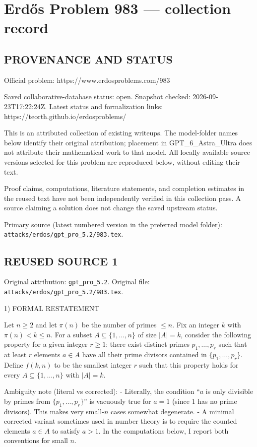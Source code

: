 \section*{Erd\H{o}s Problem 983 --- collection record}

\subsection*{PROVENANCE AND STATUS}
Official problem: https://www.erdosproblems.com/983

Saved collaborative-database status: open.
Snapshot checked: 2026-09-23T17:22:24Z.
Latest status and formalization links: https://teorth.github.io/erdosproblems/

This is an attributed collection of existing writeups. The model-folder names below identify their original attribution; placement in GPT\_6\_Astra\_Ultra does not attribute their mathematical work to that model. All locally available source versions selected for this problem are reproduced below, without editing their text.

Proof claims, computations, literature statements, and completion estimates in the reused text have not been independently verified in this collection pass. A source claiming a solution does not change the saved upstream status.

Primary source (latest numbered version in the preferred model folder): \texttt{attacks/erdos/gpt\_pro\_5.2/983.tex}.

\subsection*{REUSED SOURCE 1}
Original attribution: \texttt{gpt\_pro\_5.2}.
Original file: \texttt{attacks/erdos/gpt\_pro\_5.2/983.tex}.


1) FORMAL RESTATEMENT

Let $n\ge 2$ and let $\pi(n)$ be the number of primes $\le n$. Fix an integer $k$ with $\pi(n)<k\le n$.
For a subset $A\subseteq\{1,\dots,n\}$ of size $|A|=k$, consider the following property for a given integer $r\ge 1$:
there exist distinct primes $p_1,\dots,p_r$ such that at least $r$ elements $a\in A$ have all their prime divisors contained in $\{p_1,\dots,p_r\}$.
Define $f(k,n)$ to be the smallest integer $r$ such that this property holds for every $A\subseteq\{1,\dots,n\}$ with $|A|=k$.

Ambiguity note (literal vs corrected):
- Literally, the condition ``$a$ is only divisible by primes from $\{p_1,\dots,p_r\}$'' is vacuously true for $a=1$ (since $1$ has no prime divisors). This makes very small-$n$ cases somewhat degenerate.
- A minimal corrected variant sometimes used in number theory is to require the counted elements $a\in A$ to satisfy $a>1$.
In the computations below, I report both conventions for small $n$.

